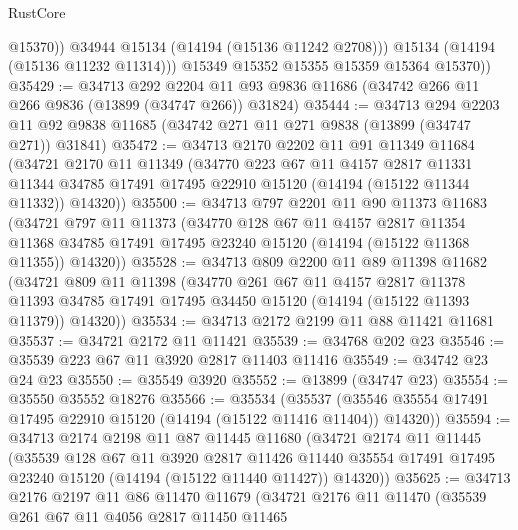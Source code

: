 \begin{lexlean}{RustCore}
\begin{coremodule}
                @15370))
            @34944
            @15134
            (@14194 (@15136 @11242 @2708)))
          @15134
          (@14194 (@15136 @11232 @11314)))
        @15349
        @15352
        @15355
        @15359
        @15364
        @15370))
@35429 := @34713
    @292
    @2204
    @11
    @93
    @9836
    @11686
    (@34742 @266 @11 @266 @9836 (@13899 (@34747 @266)) @31824)
@35444 := @34713
    @294
    @2203
    @11
    @92
    @9838
    @11685
    (@34742 @271 @11 @271 @9838 (@13899 (@34747 @271)) @31841)
@35472 := @34713
    @2170
    @2202
    @11
    @91
    @11349
    @11684
    (@34721
      @2170
      @11
      @11349
      (@34770
        @223
        @67
        @11
        @4157
        @2817
        @11331
        @11344
        @34785
        @17491
        @17495
        @22910
        @15120
        (@14194 (@15122 @11344 @11332))
        @14320))
@35500 := @34713
    @797
    @2201
    @11
    @90
    @11373
    @11683
    (@34721
      @797
      @11
      @11373
      (@34770
        @128
        @67
        @11
        @4157
        @2817
        @11354
        @11368
        @34785
        @17491
        @17495
        @23240
        @15120
        (@14194 (@15122 @11368 @11355))
        @14320))
@35528 := @34713
    @809
    @2200
    @11
    @89
    @11398
    @11682
    (@34721
      @809
      @11
      @11398
      (@34770
        @261
        @67
        @11
        @4157
        @2817
        @11378
        @11393
        @34785
        @17491
        @17495
        @34450
        @15120
        (@14194 (@15122 @11393 @11379))
        @14320))
@35534 := @34713 @2172 @2199 @11 @88 @11421 @11681
@35537 := @34721 @2172 @11 @11421
@35539 := @34768 @202 @23
@35546 := @35539 @223 @67 @11 @3920 @2817 @11403 @11416
@35549 := @34742 @23 @24 @23
@35550 := @35549 @3920
@35552 := @13899 (@34747 @23)
@35554 := @35550 @35552 @18276
@35566 := @35534
    (@35537 (@35546 @35554 @17491 @17495 @22910 @15120 (@14194 (@15122 @11416 @11404)) @14320))
@35594 := @34713
    @2174
    @2198
    @11
    @87
    @11445
    @11680
    (@34721
      @2174
      @11
      @11445
      (@35539
        @128
        @67
        @11
        @3920
        @2817
        @11426
        @11440
        @35554
        @17491
        @17495
        @23240
        @15120
        (@14194 (@15122 @11440 @11427))
        @14320))
@35625 := @34713
    @2176
    @2197
    @11
    @86
    @11470
    @11679
    (@34721
      @2176
      @11
      @11470
      (@35539
        @261
        @67
        @11
        @4056
        @2817
        @11450
        @11465

\end{coremodule}
\end{lexlean}
